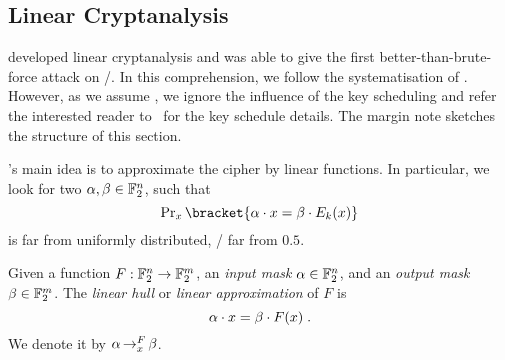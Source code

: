 \subsection{Linear Cryptanalysis}\label{sec:prelim:lc}
\textcite{EC:Matsui93} developed linear cryptanalysis and was able to give the first better-than-brute-force attack on \DES/.
In this comprehension, we follow the systematisation of \textcite[Section~2]{ToSC:KraLeaWie17}.
However, as we assume , we ignore the influence of the key scheduling and refer the interested reader to~\cite{ToSC:KraLeaWie17} for the key schedule details.
The margin note sketches the structure of this section.

\citeauthor{EC:Matsui93}'s main idea is to approximate the cipher by linear functions.
In particular, we look for two $\alpha, \beta \in \mathbb{F}_2^n$, such that
\begin{equation}\label{eqn:linear-approx}
    \Prob_x\bracket{\iprod{\alpha}{x} = \iprod{\beta}{E_k(x)}}
\end{equation}
is far from uniformly distributed, \ie/ far from $0.5$.
\begin{definition}
    Given a function $F : \mathbb{F}_2^n \to \mathbb{F}_2^m$, an \emph{input mask} $\alpha \in \mathbb{F}_2^n$, and an \emph{output mask} $\beta \in \mathbb{F}_2^m$.
    The \emph{linear hull} or \emph{linear approximation} of $F$ is
    \begin{equation*}
        \alpha \cdot x = \beta \cdot F(x)\;.
    \end{equation*}
    We denote it by $\alpha \operatorname*{\rightarrow}^{F}_{x} \beta$.
\end{definition}

